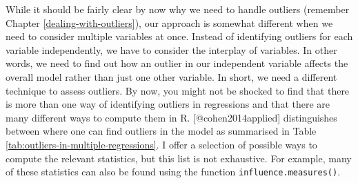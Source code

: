 \documentclass[
]{book}
\begin{document}
While it should be fairly clear by now why we need to handle outliers (remember Chapter \ref{dealing-with-outliers}), our approach is somewhat different when we need to consider multiple variables at once. Instead of identifying outliers for each variable independently, we have to consider the interplay of variables. In other words, we need to find out how an outlier in our independent variable affects the overall model rather than just one other variable. In short, we need a different technique to assess outliers. By now, you might not be shocked to find that there is more than one way of identifying outliers in regressions and that there are many different ways to compute them in R. {[}@cohen2014applied{]} distinguishes between where one can find outliers in the model as summarised in Table \ref{tab:outliers-in-multiple-regressions}. I offer a selection of possible ways to compute the relevant statistics, but this list is not exhaustive. For example, many of these statistics can also be found using the function \texttt{influence.measures()}.
\end{document}

